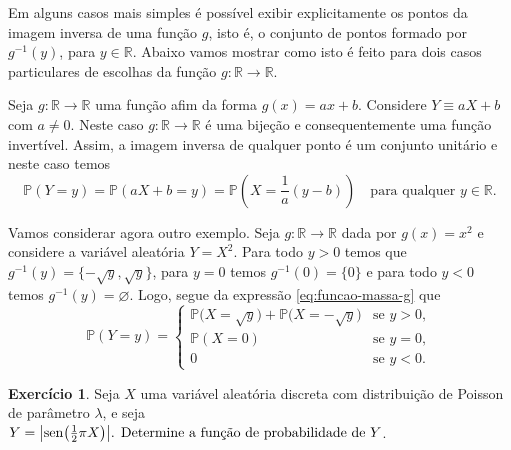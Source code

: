 \documentclass[12pt,portuguese]{article}
\theoremstyle{definition}
\newtheorem{exercise}{Exercício}
\let\emptyset\varnothing
\renewcommand{\sin}{\operatorname{sen}}
\begin{document}
Em alguns casos mais simples é possível exibir explicitamente os pontos da imagem inversa de uma função $g$,
isto é, o conjunto de pontos formado por $g^{-1}(y)$, para $y\in\mathbb{R}$. 
Abaixo vamos mostrar como isto é feito para dois casos particulares de escolhas 
da função $g:\mathbb{R}\to\mathbb{R}$. 

\bigskip 

Seja $g:\mathbb{R}\to\mathbb{R}$ uma função afim da forma $g(x)=ax+b$. 
Considere \(Y \equiv aX + b\) com \(a \neq 0\). Neste caso $g:\mathbb{R}\to\mathbb{R}$ é uma bijeção
e consequentemente uma função invertível. Assim, a imagem inversa de qualquer ponto é um conjunto unitário e neste caso temos 
\[
\mathbb{P}(Y = y) = \mathbb{P}(aX + b = y) = \mathbb{P}\left(X = \frac{1}{a}(y - b)\right)
\quad \text{para qualquer } y \in \mathbb{R}.
\]


Vamos considerar agora outro exemplo. Seja $g:\mathbb{R}\to\mathbb{R}$ dada por
$g(x)=x^2$ e considere a variável aleatória \(Y = X^2\). Para todo $y>0$
temos que $g^{-1}(y) = \{-\sqrt{y}, \sqrt{y}\}$, para $y=0$ temos $g^{-1}(0)=\{0\}$ e para todo $y<0$
temos $g^{-1}(y)=\emptyset$. Logo, segue da expressão \eqref{eq:funcao-massa-g} que
\[
\mathbb{P}(Y = y) = \begin{cases}
\mathbb{P}\bigl(X = \sqrt{y}\bigr) + \mathbb{P}\bigl(X = -\sqrt{y}\bigr) & \text{se } y > 0,\\[0.3cm]
\mathbb{P}(X = 0) & \text{se } y = 0,\\[0.3cm]
0 & \text{se } y < 0.
\end{cases}
\]

\begin{exercise}\label{exercise:poisson-seno}
Seja \(X\) uma variável aleatória discreta com distribuição de Poisson de
parâmetro \(\lambda\), e seja \(Y = \bigl|\sin\bigl(\tfrac{1}{2}\pi X\bigr)\bigr|$.
Determine a função de probabilidade de \(Y\).
\end{exercise}
\end{document}
